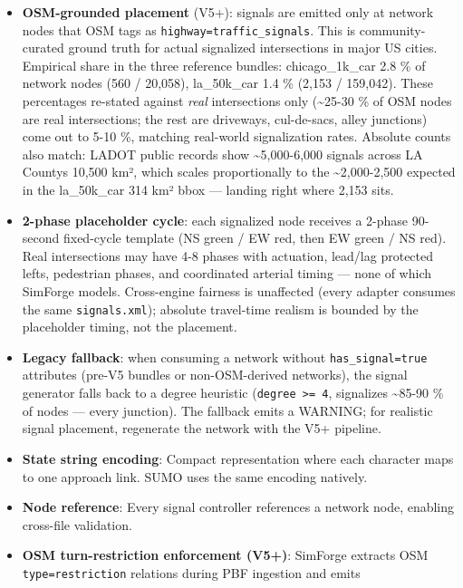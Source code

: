 \begin{itemize}
\tightlist
\item
  \textbf{OSM-grounded placement} (V5+): signals are emitted only at
  network nodes that OSM tags as \texttt{highway=traffic\_signals}. This
  is community- curated ground truth for actual signalized intersections
  in major US cities. Empirical share in the three reference bundles:
  chicago\_1k\_car 2.8 \% of network nodes (560 / 20,058), la\_50k\_car
  1.4 \% (2,153 / 159,042). These percentages re-stated against
  \emph{real} intersections only (\textasciitilde25-30 \% of OSM nodes
  are real intersections; the rest are driveways, cul-de-sacs, alley
  junctions) come out to 5-10 \%, matching real-world signalization
  rates. Absolute counts also match: LADOT public records show
  \textasciitilde5,000-6,000 signals across LA County\textquotesingle s
  10,500 km², which scales proportionally to the
  \textasciitilde2,000-2,500 expected in the la\_50k\_car 314 km² bbox
  --- landing right where 2,153 sits.
\item
  \textbf{2-phase placeholder cycle}: each signalized node receives a
  2-phase 90-second fixed-cycle template (NS green / EW red, then EW
  green / NS red). Real intersections may have 4-8 phases with
  actuation, lead/lag protected lefts, pedestrian phases, and
  coordinated arterial timing --- none of which SimForge models.
  Cross-engine fairness is unaffected (every adapter consumes the same
  \texttt{signals.xml}); absolute travel-time realism is bounded by the
  placeholder timing, not the placement.
\item
  \textbf{Legacy fallback}: when consuming a network without
  \texttt{has\_signal=true} attributes (pre-V5 bundles or
  non-OSM-derived networks), the signal generator falls back to a degree
  heuristic (\texttt{degree\ \textgreater{}=\ 4}, signalizes
  \textasciitilde85-90 \% of nodes --- every junction). The fallback
  emits a WARNING; for realistic signal placement, regenerate the
  network with the V5+ pipeline.
\item
  \textbf{State string encoding}: Compact representation where each
  character maps to one approach link. SUMO uses the same encoding
  natively.
\item
  \textbf{Node reference}: Every signal controller references a network
  node, enabling cross-file validation.
\item
  \textbf{OSM turn-restriction enforcement (V5+)}: SimForge extracts OSM
  \texttt{type=restriction} relations during PBF ingestion and emits

\end{itemize}
